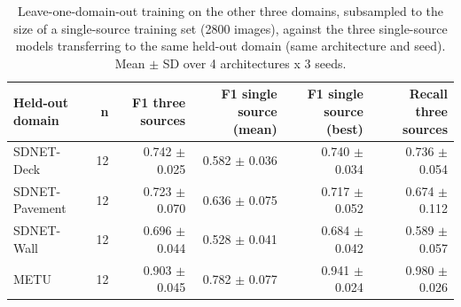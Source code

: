 \begin{table}[htbp]
\centering
\caption{Leave-one-domain-out training on the other three domains, subsampled to the size of a single-source training set (2800 images), against the three single-source models transferring to the same held-out domain (same architecture and seed). Mean $\pm$ SD over 4 architectures x 3 seeds.}
\label{tab:multifuente}
\begin{tabular}{lrrrrr}
\toprule
Held-out domain & n & F1 three sources & F1 single source (mean) & F1 single source (best) & Recall three sources \\
\midrule
SDNET-Deck & 12 & 0.742 $\pm$ 0.025 & 0.582 $\pm$ 0.036 & 0.740 $\pm$ 0.034 & 0.736 $\pm$ 0.054 \\
SDNET-Pavement & 12 & 0.723 $\pm$ 0.070 & 0.636 $\pm$ 0.075 & 0.717 $\pm$ 0.052 & 0.674 $\pm$ 0.112 \\
SDNET-Wall & 12 & 0.696 $\pm$ 0.044 & 0.528 $\pm$ 0.041 & 0.684 $\pm$ 0.042 & 0.589 $\pm$ 0.057 \\
METU & 12 & 0.903 $\pm$ 0.045 & 0.782 $\pm$ 0.077 & 0.941 $\pm$ 0.024 & 0.980 $\pm$ 0.026 \\
\bottomrule
\end{tabular}
\end{table}
